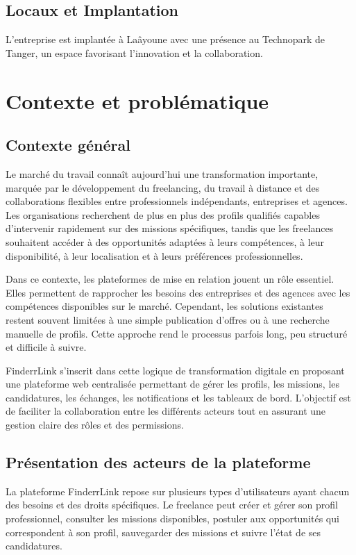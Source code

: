 \subsection{Locaux et Implantation}

L'entreprise est implantée à Laâyoune avec une présence au Technopark de Tanger, un espace favorisant l'innovation et la collaboration.
\section{Contexte et problématique}

\subsection{Contexte général}

Le marché du travail connaît aujourd’hui une transformation importante, marquée par le développement du freelancing, du travail à distance et des collaborations flexibles entre professionnels indépendants, entreprises et agences. Les organisations recherchent de plus en plus des profils qualifiés capables d’intervenir rapidement sur des missions spécifiques, tandis que les freelances souhaitent accéder à des opportunités adaptées à leurs compétences, à leur disponibilité, à leur localisation et à leurs préférences professionnelles.

Dans ce contexte, les plateformes de mise en relation jouent un rôle essentiel. Elles permettent de rapprocher les besoins des entreprises et des agences avec les compétences disponibles sur le marché. Cependant, les solutions existantes restent souvent limitées à une simple publication d’offres ou à une recherche manuelle de profils. Cette approche rend le processus parfois long, peu structuré et difficile à suivre.

FinderrLink s’inscrit dans cette logique de transformation digitale en proposant une plateforme web centralisée permettant de gérer les profils, les missions, les candidatures, les échanges, les notifications et les tableaux de bord. L’objectif est de faciliter la collaboration entre les différents acteurs tout en assurant une gestion claire des rôles et des permissions.

\subsection{Présentation des acteurs de la plateforme}

La plateforme FinderrLink repose sur plusieurs types d’utilisateurs ayant chacun des besoins et des droits spécifiques. Le freelance peut créer et gérer son profil professionnel, consulter les missions disponibles, postuler aux opportunités qui correspondent à son profil, sauvegarder des missions et suivre l’état de ses candidatures.

